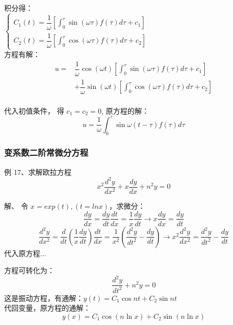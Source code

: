 \begin{frame}
	积分得：\\  
	$\displaystyle \begin{cases}
		C_1(t)=\dfrac{1}{\omega} [\int_{0}^{\tau} \sin(\omega \tau) f(\tau)  d\tau +c_1 ]\\ 
		C_2(t)=\dfrac{1}{\omega} [\int_{0}^{\tau} \cos(\omega \tau) f(\tau)  d\tau +c_2 ]\
	\end{cases} $ \\ \vspace{0.3cm}
	方程有解：\\
	\begin{align*}
		u=&\dfrac{1}{\omega}\cos(\omega t)[\int_{0}^{\tau} \sin(\omega \tau) f(\tau)  d\tau +c_1 ] \\
		&+\dfrac{1}{\omega} \sin(\omega t) [\int_{0}^{\tau} \cos(\omega \tau) f(\tau)  d\tau +c_2 ]
	\end{align*} \\ \vspace{0.3cm}
	代入初值条件， 得 $c_1=c_2=0$, 原方程的解：\\
	\begin{equation*}
		u=\frac{1}{\omega}\int_{0}^{\tau} \sin\omega (t-\tau)  f(\tau)  d\tau
	\end{equation*}   
\end{frame}

\begin{frame}
\frametitle{变系数二阶常微分方程}
	\begin{exampleblock} 	{例 17、求解欧拉方程}
	\begin{equation*}
		x^2 \frac{d^2 y}{d x^2} +x \frac{d y}{d x} +n^2 y =0 
	\end{equation*}     
	\end{exampleblock}	
	\alert{解、}  令 $x=exp(t) , (t=ln x)$，求微分：\\
	\begin{equation*}
		\frac{d y}{d x}  = 	\frac{d y}{d t}\frac{d t}{d x}= \frac{1}{ x}\frac{d y}{d t}  \to x \frac{d y}{d x}=	\frac{d y}{d t}
    \end{equation*} 
	\begin{equation*}
		\frac{d ^2y}{d x^2}  = 	\frac{d }{d t} ( \frac{1}{ x}\frac{d y}{d t}  )\frac{d t}{d x}=  
		\frac{1}{ x^2}(\frac{d ^2y}{d t^2} -	\frac{d y}{d t})   \to  	x^2 \frac{d^2 y}{d x^2} = \frac{d ^2y}{d t^2} -	\frac{d y}{d t}
	\end{equation*} 
	代入原方程...
\end{frame}

\begin{frame}
	方程可转化为：
	\begin{equation*}
		\frac{d^2 y}{d t^2}  +n^2 y =0 
	\end{equation*}     
	这是振动方程，有通解：$	y(t)=C_1 \cos n t +C_2 \sin n t$ \\
	代回变量，原方程的通解：
	\begin{equation*}
		y(x)=C_1 \cos (n \ln x) +C_2 \sin (n \ln x)
	\end{equation*}    
\end{frame}

